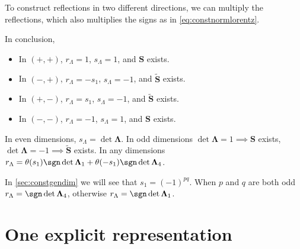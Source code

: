 \documentclass[11pt]{article}
\renewcommand{\S}{\mathbf{S}}
\newcommand{\St}{\widetilde{\S}}
\newcommand{\Lambdab}{\boldsymbol{\Lambda}}
\begin{document}
To construct reflections in two different directions, we can multiply the reflections, which also multiplies the signs as in \cref{eq:constnormlorentz}.

In conclusion,
%
\begin{itemize}
  \item In \((+,+)\), \(r_\Lambda = 1\), \(s_\Lambda = 1\), and \(\S\) exists.
  \item In \((-,+)\), \(r_\Lambda = -s_1\), \(s_\Lambda = -1\), and \(\St\) exists.
  \item In \((+,-)\), \(r_\Lambda = s_1\), \(s_\Lambda = -1\), and \(\St\) exists.
  \item In \((-,-)\), \(r_\Lambda = -1\), \(s_\Lambda = 1\), and \(\S\) exists.
\end{itemize}
%
In even dimensions, \(s_\Lambda = \det \Lambdab\). 
In odd dimensions \(\det \Lambdab = 1 \implies \S\) exists, \(\det \Lambdab = -1 \implies \St\) exists.
In any dimensions \(r_\Lambda = \theta(s_1) \sgn \det \Lambdab_1 + \theta(-s_1) \sgn \det \Lambdab_4\).

In \cref{sec:constgendim} we will see that \(s_1 = (-1)^{pq}\).
When \(p\) and \(q\) are both odd \(r_\Lambda = \sgn \det \Lambdab_4\), 
otherwise \(r_\Lambda = \sgn \det \Lambdab_1\).



\section{One explicit representation}\label{sec:explicit}
\end{document}
